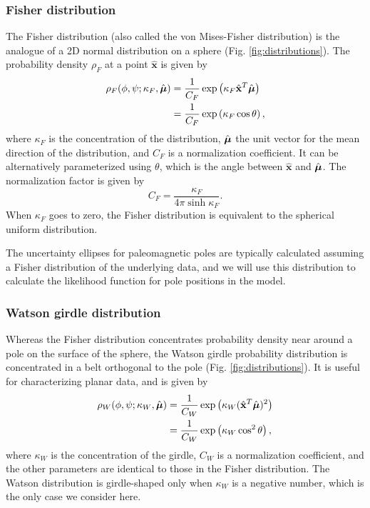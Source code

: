 \documentclass[11pt,letterpaper]{article}
\newcommand{\mitbf}[1]{\hbox{\mathversion{bold}$#1$}}
\begin{document}
\subsubsection*{Fisher distribution}
The Fisher distribution (also called the von Mises-Fisher distribution) is the analogue of a 2D normal distribution on a sphere (Fig. \ref{fig:distributions}). The probability density $\rho_F$ at a point $\hat{\mathbf{x}}$ is given by
\begin{equation}
  \begin{aligned}
  \rho_F(\phi, \psi ; \kappa_F, \hat{\mitbf{\mu}}) 
  &= \frac{1}{C_F} \exp \left( \kappa_F \hat{\mathbf{x}}^T \hat{\mitbf{\mu}} \right) \\
  &= \frac{1}{C_F} \exp \left( \kappa_F \cos \theta \right),
  \end{aligned}
\end{equation}
where $\kappa_F$ is the concentration of the distribution, 
$\hat{\mitbf{\mu}}$ the unit vector for the mean direction of the distribution, and $C_F$ is a normalization coefficient. It can be alternatively parameterized using $\theta$, which is the angle between $\hat{\mathbf{x}}$ and $\hat{\mitbf{\mu}}$.
The normalization factor is given by 
\begin{equation}
  C_F = \frac{\kappa_F}{4 \pi \sinh{\kappa_F}}.
\end{equation}
When $\kappa_F$ goes to zero, the Fisher distribution is equivalent to the spherical uniform distribution.

The uncertainty ellipses for paleomagnetic poles are typically calculated assuming a Fisher distribution of the underlying data, and we will use this distribution to calculate the likelihood function for pole positions in the model.

\subsubsection*{Watson girdle distribution}
Whereas the Fisher distribution concentrates probability density near around a pole on the surface of the sphere, the Watson girdle probability distribution is concentrated in a belt orthogonal to the pole (Fig. \ref{fig:distributions}). It is useful for characterizing planar data, and is given by
\begin{equation}
  \begin{aligned}
  \rho_W(\phi, \psi; \kappa_W, \hat{\mitbf{\mu}}) 
  &= \frac{1}{C_W} \exp \left( \kappa_W (\hat{\mathbf{x}}^T \hat{\mitbf{\mu}})^2 \right) \\
  &= \frac{1}{C_W} \exp \left( \kappa_W \cos^2 \theta \right),
  \end{aligned}
\label{eq:watson}
\end{equation}
where $\kappa_W$ is the concentration of the girdle, $C_W$ is a normalization coefficient, and the other parameters are identical to those in the Fisher distribution. The Watson distribution is girdle-shaped only when $\kappa_W$ is a negative number, which is the only case we consider here.
\end{document}
